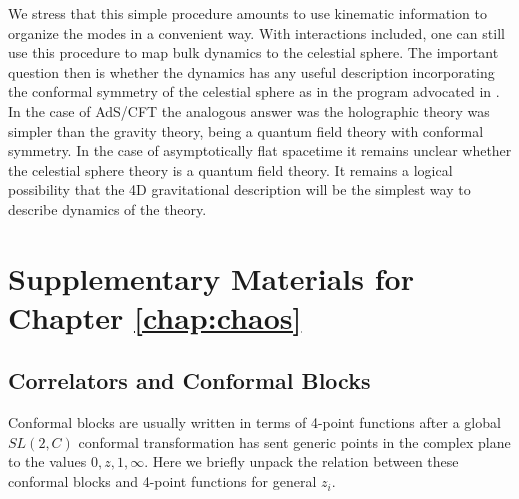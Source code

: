 \documentclass{brownthesis}
\begin{document}
We stress that this simple procedure amounts to use kinematic information
to organize the modes in a convenient way. With interactions included,
one can still use this procedure to map bulk dynamics to the celestial
sphere. The important question then is whether the dynamics has any
useful description incorporating the conformal symmetry of the celestial
sphere as in the program advocated in \cite{Pasterski:2016qvg}. In
the case of AdS/CFT the analogous answer was the holographic theory
was simpler than the gravity theory, being a quantum field theory
with conformal symmetry. In the case of asymptotically flat spacetime
it remains unclear whether the celestial sphere theory is a quantum
field theory. It remains a logical possibility that the 4D gravitational
description will be the simplest way to describe dynamics of the theory.

\appendix

\chapter{Supplementary Materials for Chapter \ref{chap:chaos}}

\section{\label{sec:Correlators-and-Conformal}Correlators and Conformal Blocks}

Conformal blocks are usually written in terms of 4-point functions
after a global $SL(2,C)$ conformal transformation has sent generic
points in the complex plane to the values $0,z,1,\infty$. Here we
briefly unpack the relation between these conformal blocks and 4-point
functions for general $z_{i}$.
\end{document}
